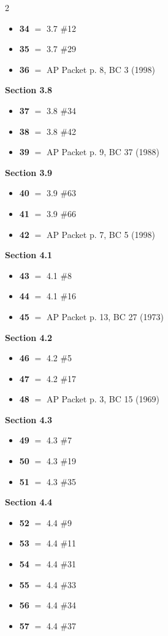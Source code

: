 \documentclass[11pt]{article}
\begin{document}
\begin{multicols}{2}
\begin{itemize}[leftmargin=1.5em,itemsep=1pt,topsep=2pt]
\item[] \textbf{34} $=$ 3.7 \#12
\item[] \textbf{35} $=$ 3.7 \#29
\item[] \textbf{36} $=$ AP Packet p. 8, BC 3 (1998)
\end{itemize}
\smallskip
\noindent\textbf{Section 3.8}
\begin{itemize}[leftmargin=1.5em,itemsep=1pt,topsep=2pt]
\item[] \textbf{37} $=$ 3.8 \#34
\item[] \textbf{38} $=$ 3.8 \#42
\item[] \textbf{39} $=$ AP Packet p. 9, BC 37 (1988)
\end{itemize}
\smallskip
\noindent\textbf{Section 3.9}
\begin{itemize}[leftmargin=1.5em,itemsep=1pt,topsep=2pt]
\item[] \textbf{40} $=$ 3.9 \#63
\item[] \textbf{41} $=$ 3.9 \#66
\item[] \textbf{42} $=$ AP Packet p. 7, BC 5 (1998)
\end{itemize}
\smallskip
\noindent\textbf{Section 4.1}
\begin{itemize}[leftmargin=1.5em,itemsep=1pt,topsep=2pt]
\item[] \textbf{43} $=$ 4.1 \#8
\item[] \textbf{44} $=$ 4.1 \#16
\item[] \textbf{45} $=$ AP Packet p. 13, BC 27 (1973)
\end{itemize}
\smallskip
\noindent\textbf{Section 4.2}
\begin{itemize}[leftmargin=1.5em,itemsep=1pt,topsep=2pt]
\item[] \textbf{46} $=$ 4.2 \#5
\item[] \textbf{47} $=$ 4.2 \#17
\item[] \textbf{48} $=$ AP Packet p. 3, BC 15 (1969)
\end{itemize}
\smallskip
\noindent\textbf{Section 4.3}
\begin{itemize}[leftmargin=1.5em,itemsep=1pt,topsep=2pt]
\item[] \textbf{49} $=$ 4.3 \#7
\item[] \textbf{50} $=$ 4.3 \#19
\item[] \textbf{51} $=$ 4.3 \#35
\end{itemize}
\smallskip
\noindent\textbf{Section 4.4}
\begin{itemize}[leftmargin=1.5em,itemsep=1pt,topsep=2pt]
\item[] \textbf{52} $=$ 4.4 \#9
\item[] \textbf{53} $=$ 4.4 \#11
\item[] \textbf{54} $=$ 4.4 \#31
\item[] \textbf{55} $=$ 4.4 \#33
\item[] \textbf{56} $=$ 4.4 \#34
\item[] \textbf{57} $=$ 4.4 \#37
\end{itemize}
\smallskip
\end{multicols}
\end{document}
